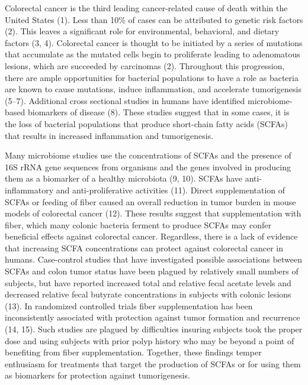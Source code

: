 \documentclass[11pt,]{article}
\begin{document}
\newpage

Colorectal cancer is the third leading cancer-related cause of death
within the United States (1). Less than 10\% of cases can be attributed
to genetic risk factors (2). This leaves a significant role for
environmental, behavioral, and dietary factors (3, 4). Colorectal cancer
is thought to be initiated by a series of mutations that accumulate as
the mutated cells begin to proliferate leading to adenomatous lesions,
which are succeeded by carcinomas (2). Throughout this progression,
there are ample opportunities for bacterial populations to have a role
as bacteria are known to cause mutations, induce inflammation, and
accelerate tumorigenesis (5--7). Additional cross sectional studies in
humans have identified microbiome-based biomarkers of disease (8). These
studies suggest that in some cases, it is the loss of bacterial
populations that produce short-chain fatty acids (SCFAs) that results in
increased inflammation and tumorigenesis.

Many microbiome studies use the concentrations of SCFAs and the presence
of 16S rRNA gene sequences from organisms and the genes involved in
producing them as a biomarker of a healthy microbiota (9, 10). SCFAs
have anti-inflammatory and anti-proliferative activities (11). Direct
supplementation of SCFAs or feeding of fiber caused an overall reduction
in tumor burden in mouse models of colorectal cancer (12). These results
suggest that supplementation with fiber, which many colonic bacteria
ferment to produce SCFAs may confer beneficial effects against
colorectal cancer. Regardless, there is a lack of evidence that
increasing SCFA concentrations can protect against colorectal cancer in
humans. Case-control studies that have investigated possible
associations between SCFAs and colon tumor status have been plagued by
relatively small numbers of subjects, but have reported increased total
and relative fecal acetate levels and decreased relative fecal butyrate
concentrations in subjects with colonic lesions (13). In randomized
controlled trials fiber supplementation has been inconsistently
associated with protection against tumor formation and recurrence (14,
15). Such studies are plagued by difficulties insuring subjects took the
proper dose and using subjects with prior polyp history who may be
beyond a point of benefiting from fiber supplementation. Together, these
findings temper enthusiasm for treatments that target the production of
SCFAs or for using them as biomarkers for protection against
tumorigenesis.
\end{document}
